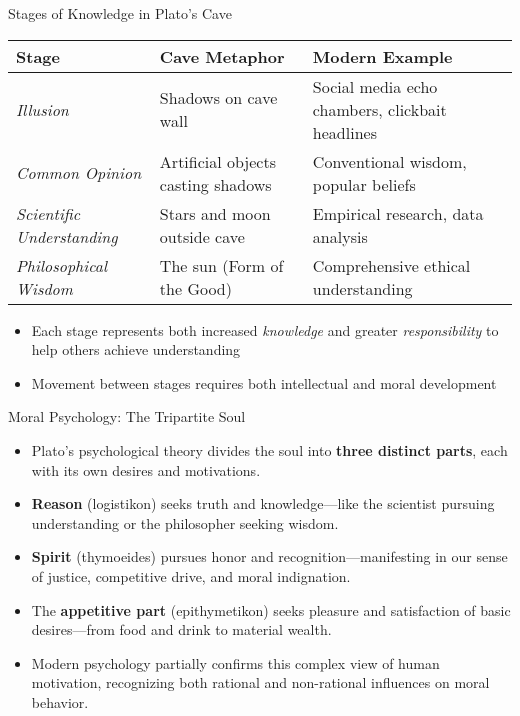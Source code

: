 \documentclass[aspectratio=169]{beamer}
\begin{document}
\begin{frame}{Stages of Knowledge in Plato's Cave}
\begin{center}
\begin{tabular}{|p{2.5cm}|p{4cm}|p{4cm}|}
\hline
\textbf{Stage} & \textbf{Cave Metaphor} & \textbf{Modern Example} \\
\hline
\emph{Illusion} & Shadows on cave wall & Social media echo chambers, clickbait headlines \\
\hline
\emph{Common Opinion} & Artificial objects casting shadows & Conventional wisdom, popular beliefs \\
\hline
\emph{Scientific Understanding} & Stars and moon outside cave & Empirical research, data analysis \\
\hline
\emph{Philosophical Wisdom} & The sun (Form of the Good) & Comprehensive ethical understanding \\
\hline
\end{tabular}
\end{center}
\vspace{0.3cm}
\begin{itemize}
\item Each stage represents both increased \emph{knowledge} and greater \emph{responsibility} to help others achieve understanding
\item Movement between stages requires both intellectual and moral development
\end{itemize}
\end{frame}
\begin{frame}{Moral Psychology: The Tripartite Soul}
\begin{itemize}
\item Plato's psychological theory divides the soul into \textbf{three distinct parts}, each with its own desires and motivations.
\item \textbf{Reason} (logistikon) seeks truth and knowledge—like the scientist pursuing understanding or the philosopher seeking wisdom.
\item \textbf{Spirit} (thymoeides) pursues honor and recognition—manifesting in our sense of justice, competitive drive, and moral indignation.
\item The \textbf{appetitive part} (epithymetikon) seeks pleasure and satisfaction of basic desires—from food and drink to material wealth.
\item Modern psychology partially confirms this complex view of human motivation, recognizing both rational and non-rational influences on moral behavior.
\end{itemize}
\end{frame}
\end{document}
